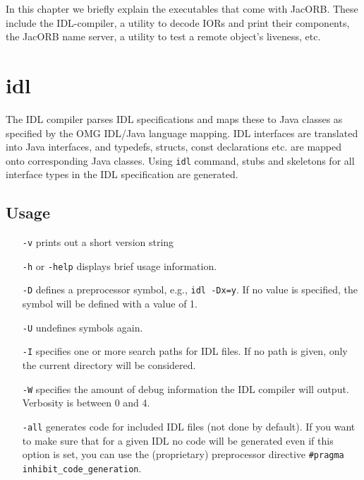 In this chapter we  briefly explain the executables that come
with JacORB. These include the IDL-compiler, a utility to decode IORs
and print their components, the JacORB name server, a utility to test
a remote object's liveness, etc.

\section{idl}

The IDL compiler parses IDL specifications and maps these to Java
classes as specified by the OMG IDL/Java language mapping. IDL
interfaces are translated into Java interfaces, and typedefs, structs,
const declarations etc.  are mapped onto corresponding Java classes.
Using {\tt idl} command, stubs and skeletons for all interface types
in the IDL specification are generated.

\subsection*{Usage}


\begin{itemize}
\item[\tt -v] prints out a short version string 
\item[\tt -h] or {\tt -help} displays brief usage information.
\item[\tt -D] defines a preprocessor symbol, e.g., {\tt idl -Dx=y}. If
  no value is specified, the symbol will be defined with a value of 1.
\item[\tt -U] undefines symbols again.
\item[\tt -I] specifies one or more search paths for
IDL files. If no path is given, only the  current directory will  be considered.
\item[\tt -W] specifies the amount of debug information the IDL
 compiler will output. Verbosity is between 0 and 4.
\item[\tt -all] generates code for included IDL files (not done by
  default). If you want to make sure that for a given IDL no code will
  be generated even if this option is set, you can use the
  (proprietary) preprocessor directive {\tt \#pragma
    inhibit\_code\_generation}.
\end{itemize}

